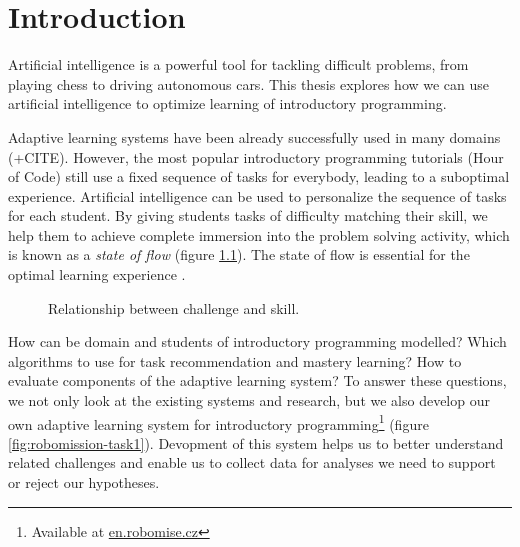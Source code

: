 \chapter{Introduction}
\label{chap:introduction}

Artificial intelligence is a powerful tool for tackling difficult problems,
from playing chess to driving autonomous cars. %
This thesis explores how we can use artificial intelligence to optimize
learning of introductory programming.

Adaptive learning systems have been already successfully used in many domains
\cite{alg.evaluation-geography} (+CITE).
However, the most popular introductory programming tutorials
(Hour of Code) still use a fixed sequence of tasks for everybody,
leading to a suboptimal experience.
Artificial intelligence can be used to personalize the sequence of tasks
for each student.
By giving students tasks of difficulty matching their skill,
we help them to achieve complete immersion into the problem solving
activity, which is known as a \emph{state of flow} \cite{flow}
(figure \ref{fig:flow}).
The state of flow is essential for the optimal learning experience
\cite{adaptive-practice}.

\begin{figure}[htb]
  \centering
  \caption{Relationship between challenge and skill.}
  \label{fig:flow}
\end{figure}


How can be domain and students of introductory programming modelled?
Which algorithms to use for task recommendation and mastery learning?
How to evaluate components of the adaptive learning system?
To answer these questions, we not only look at the existing systems
and research, but we also develop our own adaptive learning system for
introductory programming\footnote{Available at \url{en.robomise.cz}}
(figure \ref{fig:robomission-task1}).
Devopment of this system helps us to better understand related challenges
and enable us to collect data for analyses we need to support or reject our hypotheses.

